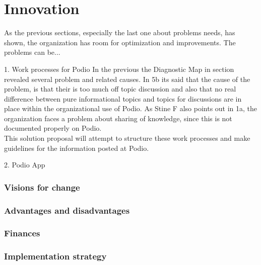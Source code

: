 \part{Innovation}
As the previous sections, especially the last one about problems needs, has shown, the organization has room for optimization and improvements. The problems can be...


1. Work processes for Podio
In the previous the Diagnostic Map in section revealed several problem and related causes. In 5b its said that the cause of the problem, is that their is too much off topic discussion and also that no real difference between pure informational topics and topics for discussions are in place within the organizational use of Podio. As Stine F also points out in 1a, the organization faces a problem about sharing of knowledge, since this is not documented properly on Podio.\\

This solution proposal will attempt to structure these work processes and make guidelines for the information posted at Podio. 

2. Podio App

\section{Visions for change}

\section{Advantages and disadvantages}

\section{Finances}

\section{Implementation strategy}


